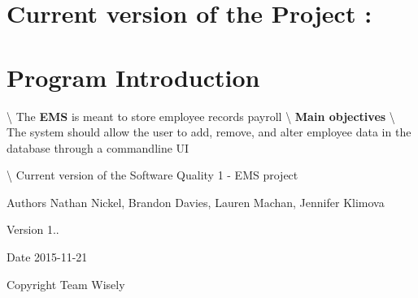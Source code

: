 \hypertarget{index_version}{}\section{Current version of the Project \+:}\label{index_version}
\hypertarget{index_intro}{}\section{Program Introduction}\label{index_intro}
\textbackslash{} The {\bfseries E\+M\+S} is meant to store employee records payroll \textbackslash{} {\bfseries Main objectives} \textbackslash{} The system should allow the user to add, remove, and alter employee data in the database through a commandline U\+I



 \textbackslash{} Current version of the Software Quality 1 -\/ E\+M\+S project 
\begin{DoxyItemize}
\item \begin{DoxyAuthor}{Authors}
Nathan Nickel, Brandon Davies, Lauren Machan, Jennifer Klimova 
\end{DoxyAuthor}

\item \begin{DoxyVersion}{Version}
1.. 
\end{DoxyVersion}

\item \begin{DoxyDate}{Date}
2015-\/11-\/21 
\end{DoxyDate}

\item \begin{DoxyCopyright}{Copyright}
Team Wisely 
\end{DoxyCopyright}

\end{DoxyItemize}